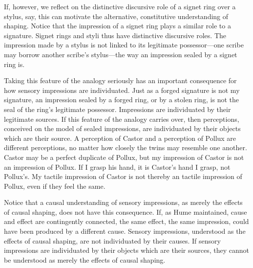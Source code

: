 If, however, we reflect on the distinctive discursive role of a signet ring over a stylus, say, this can motivate the alternative, constitutive understanding of shaping. Notice that the impression of a signet ring plays a similar role to a signature. Signet rings and styli thus have distinctive discursive roles. The impression made by a stylus is not linked to its legitimate possessor---one scribe may borrow another scribe’s stylus---the way an impression sealed by a signet ring is.


Taking this feature of the analogy seriously has an important consequence for how sensory impressions are individuated. Just as a forged signature is not my signature, an impression sealed by a forged ring, or by a stolen ring, is not the seal of the ring’s legitimate possessor. Impressions are individuated by their legitimate sources. If this feature of the analogy carries over, then perceptions, conceived on the model of sealed impressions, are individuated by their objects which are their source. A perception of Castor and a perception of Pollux are different perceptions, no matter how closely the twins may resemble one another. Castor may be a perfect duplicate of Pollux, but my impression of Castor is not an impression of Pollux. If I grasp his hand, it is Castor's hand I grasp, not Pollux's. My tactile impression of Castor is not thereby an tactile impression of Pollux, even if they feel the same.


Notice that a causal understanding of sensory impressions, as merely the effects of causal shaping, does not have this consequence. If, as Hume maintained, cause and effect are contingently connected, the same effect, the same impression, could have been produced by a different cause. Sensory impressions, understood as the effects of causal shaping, are not individuated by their causes. If sensory impressions are individuated by their objects which are their sources, they cannot be understood as merely the effects of causal shaping. 


